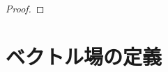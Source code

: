 \documentclass[TQFT_main]{subfiles}
\begin{document}
\begin{proof}

\end{proof}

\section{ベクトル場の定義}
\end{document}
